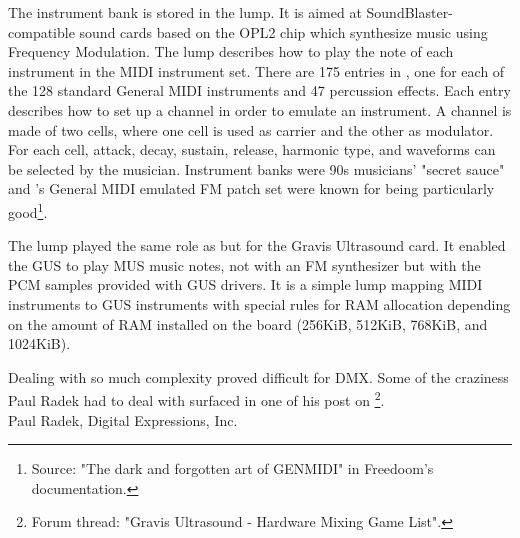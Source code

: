 \par
The instrument bank is stored in the  lump. It is aimed at SoundBlaster-compatible sound cards based on the OPL2 chip which synthesize music using Frequency Modulation. The lump describes how to play the note of each instrument in the MIDI instrument set. There are 175 entries in , one for each of the 128 standard General MIDI instruments and 47 percussion effects. Each entry describes how to set up a channel in order to emulate an instrument. A channel is made of two cells, where one cell is used as carrier and the other as modulator. For each cell, attack, decay, sustain, release, harmonic type, and waveforms can be selected by the musician. Instrument banks were 90s musicians' "secret sauce" and \doom's General MIDI emulated FM patch set were known for being particularly good\footnote{Source: "The dark and forgotten art of GENMIDI" in Freedoom's documentation.}.\\
\par
The  lump played the same role as  but for the Gravis Ultrasound card. It enabled the GUS to play MUS music notes, not with an FM synthesizer but with the PCM samples provided with GUS drivers. It is a simple lump mapping MIDI instruments to GUS instruments with special rules for RAM allocation depending on the amount of RAM installed on the board (256KiB, 512KiB, 768KiB, and 1024KiB).\pagebreak



Dealing with so much complexity proved difficult for DMX. Some of the craziness Paul Radek had to deal with surfaced in one of his post on \footnote{Forum thread: "Gravis Ultrasound - Hardware Mixing Game List".}.\\





{Paul Radek, Digital Expressions, Inc.}\\
\par

